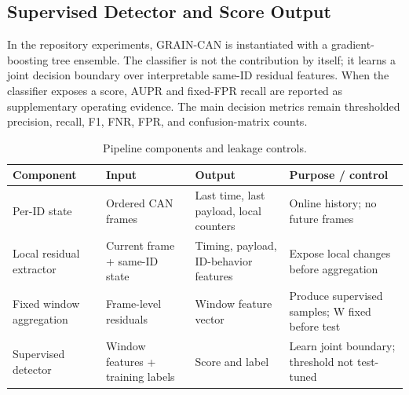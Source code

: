 \documentclass[runningheads]{llncs}
\newcommand{\method}{GRAIN-CAN}
\begin{document}
\subsection{Supervised Detector and Score Output}
In the repository experiments, \method{} is instantiated with a gradient-boosting tree ensemble. The classifier is not the contribution by itself; it learns a joint decision boundary over interpretable same-ID residual features. When the classifier exposes a score, AUPR and fixed-FPR recall are reported as supplementary operating evidence. The main decision metrics remain thresholded precision, recall, F1, FNR, FPR, and confusion-matrix counts.

\begin{table}[t]
\caption{Pipeline components and leakage controls.}
\label{tab:components}
\centering\small
\setlength{\tabcolsep}{3pt}
\begin{tabular}{p{}p{}p{}p{}}
\toprule
Component & Input & Output & Purpose / control \\
\midrule
Per-ID state & Ordered CAN frames & Last time, last payload, local counters & Online history; no future frames \\
Local residual extractor & Current frame + same-ID state & Timing, payload, ID-behavior features & Expose local changes before aggregation \\
Fixed window aggregation & Frame-level residuals & Window feature vector & Produce supervised samples; W fixed before test \\
Supervised detector & Window features + training labels & Score and label & Learn joint boundary; threshold not test-tuned \\
\bottomrule
\end{tabular}
\end{table}
\end{document}

